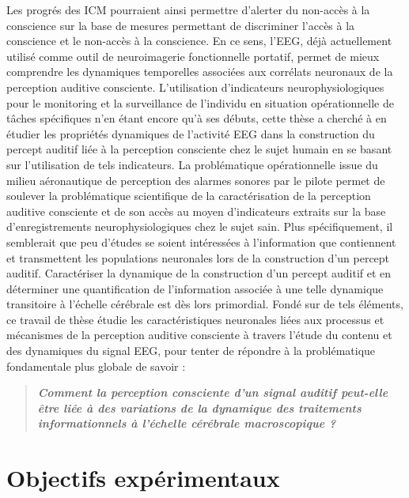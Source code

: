 Les progrés des ICM pourraient ainsi permettre d'alerter du non-accès à la conscience sur la base de mesures permettant de discriminer l'accès à la conscience et le non-accès à la conscience. 
En ce sens, l'EEG, déjà actuellement utilisé comme outil de neuroimagerie fonctionnelle portatif, permet de mieux comprendre les dynamiques temporelles associées aux corrélats neuronaux de la perception auditive consciente. 
L'utilisation d'indicateurs neurophysiologiques pour le monitoring et la surveillance de l'individu en situation opérationnelle de tâches spécifiques n'en étant encore qu'à ses débuts, cette thèse a cherché à en étudier les propriétés dynamiques de l'activité EEG dans la construction du percept auditif liée à la perception consciente chez le sujet humain en se basant sur l'utilisation de tels indicateurs.
La problématique opérationnelle issue du milieu aéronautique de perception des alarmes sonores par le pilote permet de soulever la problématique scientifique de la caractérisation de la perception auditive consciente et de son accès au moyen d'indicateurs extraits sur la base d'enregistrements neurophysiologiques chez le sujet sain. 
Plus spécifiquement, il semblerait que peu d'études se soient intéressées à l'information que contiennent et transmettent les populations neuronales lors de la construction d'un percept auditif. 
Caractériser la dynamique de la construction d'un percept auditif et en déterminer une quantification de l'information associée à une telle dynamique transitoire à l'échelle cérébrale est dès lors primordial. 
Fondé sur de tels éléments, ce travail de thèse étudie les caractéristiques neuronales liées aux processus et mécanismes de la perception auditive consciente à travers l'étude du contenu et des dynamiques du signal EEG, pour tenter de répondre à la problématique fondamentale plus globale de savoir :  
\begin{quote}
\textit{\textbf{Comment la perception consciente d'un signal auditif peut-elle être liée à des variations de la dynamique des traitements informationnels à l'échelle cérébrale macroscopique ?}}
\end{quote}

\section*{Objectifs expérimentaux}

